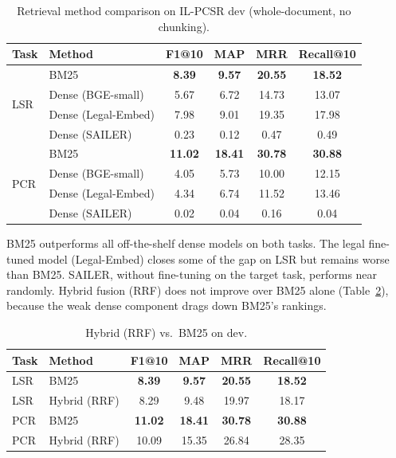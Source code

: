 \documentclass[11pt]{article}
\begin{document}
\begin{table}[h]
\centering
\caption{Retrieval method comparison on IL-PCSR dev (whole-document, no chunking).}
\label{tab:retrieval}
\begin{tabular}{llcccc}
\toprule
Task & Method & F1@10 & MAP & MRR & Recall@10 \\
\midrule
\multirow{4}{*}{LSR} & BM25 & \textbf{8.39} & \textbf{9.57} & \textbf{20.55} & \textbf{18.52} \\
 & Dense (BGE-small) & 5.67 & 6.72 & 14.73 & 13.07 \\
 & Dense (Legal-Embed) & 7.98 & 9.01 & 19.35 & 17.98 \\
 & Dense (SAILER) & 0.23 & 0.12 & 0.47 & 0.49 \\
\midrule
\multirow{4}{*}{PCR} & BM25 & \textbf{11.02} & \textbf{18.41} & \textbf{30.78} & \textbf{30.88} \\
 & Dense (BGE-small) & 4.05 & 5.73 & 10.00 & 12.15 \\
 & Dense (Legal-Embed) & 4.34 & 6.74 & 11.52 & 13.46 \\
 & Dense (SAILER) & 0.02 & 0.04 & 0.16 & 0.04 \\
\bottomrule
\end{tabular}
\end{table}

BM25 outperforms all off-the-shelf dense models on both tasks. The legal fine-tuned model (Legal-Embed) closes some of the gap on LSR but remains worse than BM25. SAILER, without fine-tuning on the target task, performs near randomly. Hybrid fusion (RRF) does not improve over BM25 alone (Table~\ref{tab:hybrid}), because the weak dense component drags down BM25's rankings.

\begin{table}[h]
\centering
\caption{Hybrid (RRF) vs.\ BM25 on dev.}
\label{tab:hybrid}
\begin{tabular}{llcccc}
\toprule
Task & Method & F1@10 & MAP & MRR & Recall@10 \\
\midrule
LSR & BM25 & \textbf{8.39} & \textbf{9.57} & \textbf{20.55} & \textbf{18.52} \\
LSR & Hybrid (RRF) & 8.29 & 9.48 & 19.97 & 18.17 \\
PCR & BM25 & \textbf{11.02} & \textbf{18.41} & \textbf{30.78} & \textbf{30.88} \\
PCR & Hybrid (RRF) & 10.09 & 15.35 & 26.84 & 28.35 \\
\bottomrule
\end{tabular}
\end{table}
\end{document}

